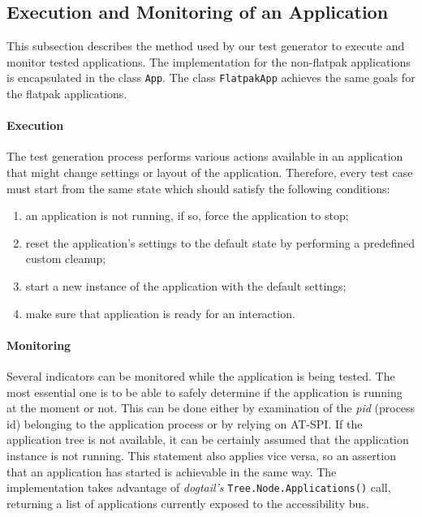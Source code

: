 \subsection{Execution and Monitoring of an Application}\label{monitoring}

This subsection describes the method used by our test generator to execute and monitor tested applications. The implementation for the non-flatpak applications is encapsulated in the class \texttt{App}. The class \texttt{FlatpakApp} achieves the same goals for the flatpak applications.

\paragraph{Execution} The test generation process performs various actions available in an application that might change settings or layout of the application. Therefore, every test case must start from the same state which should satisfy the following conditions: 
\begin{enumerate}
    \item an application is not running, if so, force the application to stop;
    \item reset the application's settings to the default state by performing a predefined custom cleanup;
    \item start a new instance of the application with the default settings;
    \item make sure that application is ready for an interaction.
\end{enumerate}

\paragraph{Monitoring} Several indicators can be monitored while the application is being tested. The most essential one is to be able to safely determine if the application is running at the moment or not. This can be done either by examination of the \textit{pid} (process id) belonging to the application process or by relying on AT-SPI. If the application tree is not available, it can be certainly assumed that the application instance is not running. This statement also applies vice versa, so an assertion that an application has started is achievable in the same way. The implementation takes advantage of \textit{dogtail's} \texttt{Tree.Node.Applications()} call, returning a list of applications currently exposed to the accessibility bus.

